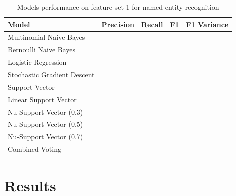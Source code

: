 \documentclass[11pt,oneside]{book}
\begin{document}
\begin{longtable}{|l|l|l|l|l|}
\caption{Models performance on feature set 1 for named entity recognition}
\label{tab:feature_set_1}\\
\hline
\textbf{Model}              & \multicolumn{1}{c|}{\textbf{Precision}} & \multicolumn{1}{c|}{\textbf{Recall}} & \textbf{F1} & \textbf{F1 Variance} \\ \hline
\endhead
%
Multinomial Naive Bayes     & \multicolumn{1}{c|}{}                   & \multicolumn{1}{c|}{}                &             &                      \\ \hline
Bernoulli Naive Bayes       &                                         &                                      &             &                      \\ \hline
Logistic Regression         &                                         &                                      &             &                      \\ \hline
Stochastic Gradient Descent &                                         &                                      &             &                      \\ \hline
Support Vector              &                                         &                                      &             &                      \\ \hline
Linear Support Vector       &                                         &                                      &             &                      \\ \hline
Nu-Support Vector (0.3)     &                                         &                                      &             &                      \\ \hline
Nu-Support Vector (0.5)     &                                         &                                      &             &                      \\ \hline
Nu-Support Vector (0.7)     &                                         &                                      &             &                      \\ \hline
Combined Voting             &                                         &                                      &             &                      \\ \hline
\end{longtable}

\chapter{Results}
\end{document}
